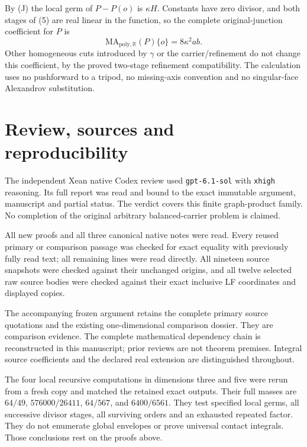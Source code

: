 \documentclass[
  11pt,
]{article}
\begin{document}
By (J) the local germ of \(P-P(o)\) is \(\kappa H\). Constants
have zero divisor, and both stages of (5) are real linear in the
function, so the complete original-junction coefficient for \(P\) is \[
                    \mathrm{MA}_{\mathrm{poly},\mathbb{R}}(P)\{o\}
                                  =8\kappa^2ab.          \tag{47}
\] Other homogeneous cuts introduced by \(\gamma\) or the
carrier/refinement do not change this coefficient, by the proved
two-stage refinement compatibility. The calculation uses no pushforward
to a tripod, no missing-axis convention and no singular-face Alexandrov
substitution.

\section{Review, sources and reproducibility}

The independent Xean native Codex review used
\texttt{gpt-6.1-sol} with \texttt{xhigh} reasoning. Its full report was
read and bound to the exact immutable argument, manuscript and partial
status. The verdict covers this finite graph-product family. No
completion of the original arbitrary balanced-carrier problem is
claimed.

All new proofs and all three canonical native notes were read. Every
reused primary or comparison passage was checked for exact equality
with previously fully read text; all remaining lines were read directly.
All nineteen source snapshots were checked against their unchanged
origins, and all twelve selected raw source bodies were checked against
their exact inclusive LF coordinates and displayed copies.

The accompanying frozen argument retains the complete primary source
quotations and the existing one-dimensional comparison dossier. They
are comparison evidence. The complete mathematical dependency chain
is reconstructed in this manuscript; prior reviews are not theorem
premises. Integral source coefficients and the declared real extension
are distinguished throughout.

The four local recursive computations in dimensions three and five
were rerun from a fresh copy and matched the retained exact outputs.
Their full masses are \(64/49\), \(576000/26411\), \(64/567\), and
\(6400/6561\). They test specified local germs, all successive divisor
stages, all surviving orders and an exhausted repeated factor. They
do not enumerate global envelopes or prove universal contact integrals.
Those conclusions rest on the proofs above.
\end{document}
